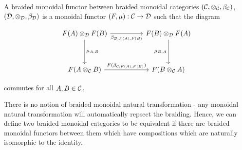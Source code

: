 \begin{defn} A braided monoidal functor between braided monoidal categories $({\mathcal C},\otimes_{{\mathcal C}},\beta_{{\mathcal C}})$, $({\mathcal D},\otimes_{{\mathcal D}},\beta_{{\mathcal D}})$ is a monoidal functor $(F,\mu):{\mathcal C}\to {\mathcal D}$ such that the diagram

\[\begin{tikzcd}
	{F(A)\otimes_{\cD}F(B)} && {F(B)\otimes_{\cD}F(A)} \\
	\\
	{F(A\otimes_{\cC}B)} && {F(B\otimes_{\cC}A)}
	\arrow["{\mu_{A,B}}", from=1-1, to=3-1]
	\arrow["{\beta_{\cD;F(A),F(B)}}"', from=1-1, to=1-3]
	\arrow["{\mu_{B,A}}"', from=1-3, to=3-3]
	\arrow["{F(\beta_{\cC;F(A),F(B)})}", from=3-1, to=3-3]
\end{tikzcd}\]

commutes for all $A,B\in {\mathcal C}$.
\end{defn}

\begin{rem}
There is no notion of braided monoidal natural transformation - any monoidal natural transformation will automatically repsect the braiding. Hence, we can define two braided monoidal categories to be equivalent if there are braided monoidal functors between them which have compositions which are naturally isomorphic to the identity.
\end{rem}


